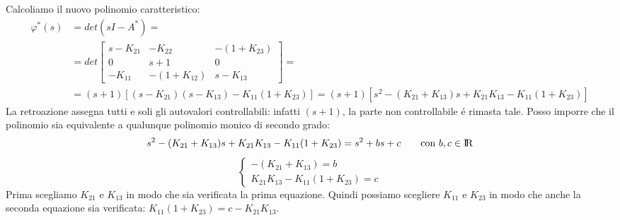 \begin{Exercise}[title={Studio completo del sistema e stabilizzazione}, difficulty=3]
			Calcoliamo il nuovo polinomio caratteristico:
			\begin{align*}
				\varphi^{*}(s) &= det(sI-A^{*}) =\\
				&= det
				\begin{bmatrix}
					s-K_{21} & -K_{22} & -(1+K_{23})\\
					0 & s+1 & 0\\
					-K_{11} & -(1+K_{12}) & s-K_{13}
				\end{bmatrix} =\\
				&= (s+1)\left[ (s-K_{21})(s-K_{13}) - K_{11}(1+K_{23}) \right] = (s+1)\left[ s^2 - (K_{21}+K_{13})s + K_{21}K_{13} - K_{11}(1+K_{23}) \right]
			\end{align*}
			La retroazione assegna tutti e soli gli autovalori controllabili: infatti $ (s+1) $, la parte non controllabile \'e rimasta tale. Posso imporre che il polinomio sia equivalente a qualunque polinomio monico di secondo grado:
			\[ s^2 - (K_{21}+K_{13})s + K_{21}K_{13} - K_{11}(1+K_{23}) = s^2 + bs + c \qquad \text{con}\ b,c \in \rm I\!R \]
			\[
				\begin{cases}
					-(K_{21} + K_{13}) = b\\
					K_{21} K_{13} - K_{11}(1+K_{23}) = c
				\end{cases}
			\]
			Prima scegliamo $ K_{21} $ e $ K_{13} $ in modo che sia verificata la prima equazione. Quindi possiamo scegliere $ K_{11} $ e $ K_{23} $ in modo che anche la seconda equazione sia verificata: $ K_{11}(1+K_{23}) = c - K_{21}K_{13} $.
	\end{Exercise}
